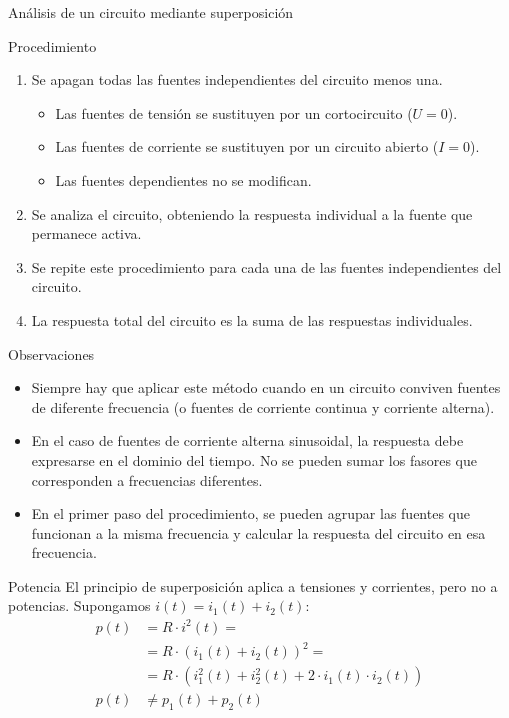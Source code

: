 \documentclass[aspectratio=169, usenames,svgnames,dvipsnames]{beamer}
\begin{document}
\begin{frame}[label={sec:org833d71a}]{Análisis de un circuito mediante superposición}
\begin{block}{Procedimiento}
\begin{enumerate}
\item Se apagan todas las fuentes \alert{independientes} del circuito menos una.
\begin{itemize}
\item Las fuentes de tensión se sustituyen por un cortocircuito (\(U = 0\)).
\item Las fuentes de corriente se sustituyen por un circuito abierto (\(I = 0\)).
\item Las fuentes \alert{dependientes} \alert{no} se modifican.
\end{itemize}
\item Se analiza el circuito, obteniendo la respuesta individual a la fuente que permanece activa.
\item Se repite este procedimiento para cada una de las fuentes \alert{independientes} del circuito.
\item La respuesta total del circuito es la suma de las respuestas individuales.
\end{enumerate}
\end{block}
\end{frame}
\begin{frame}[label={sec:orge2b7e3d}]{Observaciones}
\begin{itemize}
\item \alert{Siempre} hay que aplicar este método cuando en un circuito conviven fuentes de \alert{diferente frecuencia} (o fuentes de corriente continua y corriente alterna).
\item En el caso de fuentes de corriente alterna \alert{sinusoidal}, la respuesta debe expresarse en el \alert{dominio del tiempo}. \alert{No} se pueden \alert{sumar} los \alert{fasores} que corresponden a \alert{frecuencias diferentes}.
\item En el primer paso del procedimiento, se pueden agrupar las fuentes que funcionan a la misma frecuencia y calcular la respuesta del circuito en esa frecuencia.
\end{itemize}
\end{frame}

\begin{frame}[label={sec:org7c9a0b7}]{Potencia}
El principio de superposición aplica a tensiones y corrientes, pero \alert{no} a potencias. Supongamos \(i(t) = i_1(t) + i_2(t)\):
\begin{align*}
  p(t) &= R \cdot i^2(t) =\\
       &= R \cdot (i_1(t) + i_2(t))^2 =\\
       &=R \cdot (i_1^2(t) + i_2^2(t) + 2\cdot i_1(t) \cdot i_2(t))\\
  p(t) &\neq p_1(t) + p_2(t)
\end{align*}
\end{frame}
\end{document}
